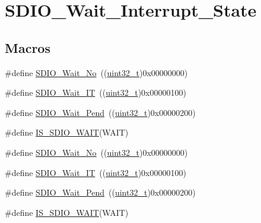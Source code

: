 \hypertarget{group___s_d_i_o___wait___interrupt___state}{}\section{S\+D\+I\+O\+\_\+\+Wait\+\_\+\+Interrupt\+\_\+\+State}
\label{group___s_d_i_o___wait___interrupt___state}
\subsection*{Macros}
\begin{DoxyCompactItemize}
\item 
\#define \hyperlink{group___s_d_i_o___wait___interrupt___state_ga266294e1ffd7a4b45e62bff753ca44b2}{S\+D\+I\+O\+\_\+\+Wait\+\_\+\+No}~((\hyperlink{_p_e___types_8h_a33594304e786b158f3fb30289278f5af}{uint32\+\_\+t})0x00000000)
\item 
\#define \hyperlink{group___s_d_i_o___wait___interrupt___state_ga3914bbe26a656c8e151272ccdc12c71c}{S\+D\+I\+O\+\_\+\+Wait\+\_\+\+IT}~((\hyperlink{_p_e___types_8h_a33594304e786b158f3fb30289278f5af}{uint32\+\_\+t})0x00000100)
\item 
\#define \hyperlink{group___s_d_i_o___wait___interrupt___state_ga2a4104023a7f8403ddd159ec3bbb8592}{S\+D\+I\+O\+\_\+\+Wait\+\_\+\+Pend}~((\hyperlink{_p_e___types_8h_a33594304e786b158f3fb30289278f5af}{uint32\+\_\+t})0x00000200)
\item 
\#define \hyperlink{group___s_d_i_o___wait___interrupt___state_ga7ee5c289c8e06a76b849808d15b03810}{I\+S\+\_\+\+S\+D\+I\+O\+\_\+\+W\+A\+IT}(W\+A\+IT)
\item 
\#define \hyperlink{group___s_d_i_o___wait___interrupt___state_ga266294e1ffd7a4b45e62bff753ca44b2}{S\+D\+I\+O\+\_\+\+Wait\+\_\+\+No}~((\hyperlink{_p_e___types_8h_a33594304e786b158f3fb30289278f5af}{uint32\+\_\+t})0x00000000)
\item 
\#define \hyperlink{group___s_d_i_o___wait___interrupt___state_ga3914bbe26a656c8e151272ccdc12c71c}{S\+D\+I\+O\+\_\+\+Wait\+\_\+\+IT}~((\hyperlink{_p_e___types_8h_a33594304e786b158f3fb30289278f5af}{uint32\+\_\+t})0x00000100)
\item 
\#define \hyperlink{group___s_d_i_o___wait___interrupt___state_ga2a4104023a7f8403ddd159ec3bbb8592}{S\+D\+I\+O\+\_\+\+Wait\+\_\+\+Pend}~((\hyperlink{_p_e___types_8h_a33594304e786b158f3fb30289278f5af}{uint32\+\_\+t})0x00000200)
\item 
\#define \hyperlink{group___s_d_i_o___wait___interrupt___state_ga7ee5c289c8e06a76b849808d15b03810}{I\+S\+\_\+\+S\+D\+I\+O\+\_\+\+W\+A\+IT}(W\+A\+IT)
\end{DoxyCompactItemize}


